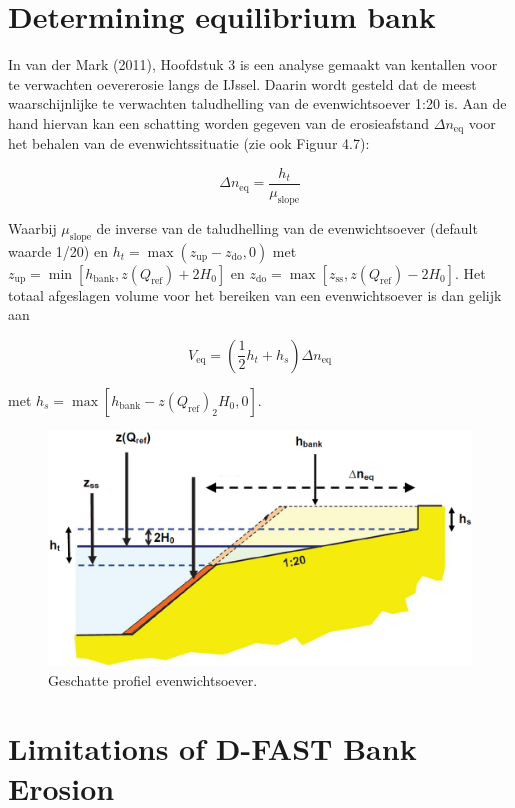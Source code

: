 \section{Determining equilibrium bank}

In van der Mark (2011), Hoofdstuk 3 is een analyse gemaakt van kentallen voor te verwachten oevererosie langs de IJssel.
Daarin wordt gesteld dat de meest waarschijnlijke te verwachten taludhelling van de evenwichtsoever 1:20 is.
Aan de hand hiervan kan een schatting worden gegeven van de erosieafstand $\Delta n_\text{eq}$ voor het behalen van de evenwichtssituatie (zie ook Figuur 4.7):

\begin{equation}
\Delta n_\text{eq} = \frac{h_t}{\mu_\text{slope}}
\end{equation}

Waarbij $\mu_\text{slope}$ de inverse van de taludhelling van de evenwichtsoever (default waarde 1/20) en $h_t = \max (z_\text{up} - z_\text{do}, 0)$ met $z_\text{up} = \min [ h_\text{bank}, z(Q_\text{ref}) + 2 H_0]$ en $z_\text{do} = \max [ z_\text{ss}, z(Q_\text{ref}) - 2 H_0 ]$.
Het totaal afgeslagen volume voor het bereiken van een evenwichtsoever is dan gelijk aan

\begin{equation}
V_\text{eq} = ( \frac{1}{2} h_t + h_s ) \Delta n_\text{eq}
\end{equation}

met $h_s = \max [ h_\text{bank} - z(Q_\text{ref}) _ 2 H_0, 0 ]$.


\begin{figure}
\includegraphics[width=\textwidth]{figures/Fig4-7.png}
\caption{Geschatte profiel evenwichtsoever.}
\label{Fig4.7}
\end{figure}

\section{Limitations of D-FAST Bank Erosion}

